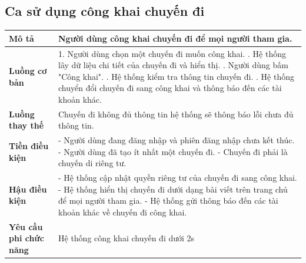 \subsection{Ca sử dụng công khai chuyến đi}
\vspace{0.5cm}


\noindent 
\begin{tabularx}{\linewidth}{| l | X |} 
\hline 
\textbf{Mô tả} & Người dùng công khai chuyến đi để mọi người tham gia. \\
\hline 
\textbf{Luồng cơ bản} & 1. Người dùng chọn một chuyến đi muốn công khai. \newline
                        2. Hệ thống lây dữ liệu chi tiết của chuyến đi và hiển thị. \newline
                        3. Người dùng bấm "Công khai". \newline
                        4. Hệ thống kiểm tra thông tin chuyến đi. \newline
                        5. Hệ thống chuyển đổi chuyến đi sang công khai và thông báo đến các tài khoản khác. \\
             
               
\hline 
\textbf{Luồng thay thế} & Chuyến đi không đủ thông tin hệ thống sẽ thông báo lỗi chưa đủ thông tin. \\
       
\hline 
\textbf{Tiền điều kiện} & - Người dùng đang đăng nhập và phiên đăng nhập chưa kết thúc.\newline
                        - Người dùng đã tạo ít nhất một chuyến đi. \newline
                        - Chuyến đi phải là chuyến di riêng tư.\\


\hline 
\textbf{Hậu điều kiện} & - Hệ thống cập nhật quyền riêng tư của chuyến đi sang công khai. \newline
- Hệ thống hiển thị chuyến đi dưới dạng bài viết trên trang chủ để mọi người tham gia. \newline
- Hệ thống gửi thông báo đến các tài khoản khác về chuyến đi công khai. \\
                        

\hline 
\textbf{Yêu cầu phi chức năng} & Hệ thống công khai chuyến đi dưới 2s \\
\hline 
\end{tabularx}

